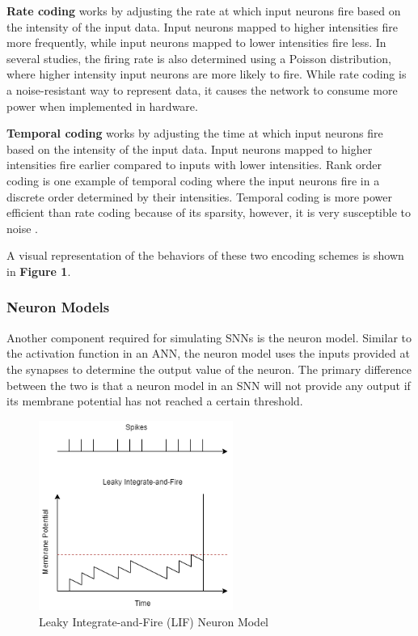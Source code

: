 \documentclass[journal]{IEEEtran}
\begin{document}
\textbf{Rate coding} works by adjusting the rate at which input neurons fire based on the intensity of the input data. Input neurons mapped to higher intensities fire more frequently, while input neurons mapped to lower intensities fire less. In several studies, the firing rate is also determined using a Poisson distribution, where higher intensity input neurons are more likely to fire. While rate coding is a noise-resistant way to represent data, it causes the network to consume more power when implemented in hardware.

\textbf{Temporal coding} works by adjusting the time at which input neurons fire based on the intensity of the input data. Input neurons mapped to higher intensities fire earlier compared to inputs with lower intensities. Rank order coding is one example of temporal coding where the input neurons fire in a discrete order determined by their intensities. Temporal coding is more power efficient than rate coding because of its sparsity, however, it is very susceptible to noise \cite{thorpe1998rank}.

A visual representation of the behaviors of these two encoding schemes is shown in \textbf{Figure 1}.


\subsubsection{Neuron Models}

Another component required for simulating SNNs is the neuron model. Similar to the activation function in an ANN, the neuron model uses the inputs provided at the synapses to determine the output value of the neuron. The primary difference between the two is that a neuron model in an SNN will not provide any output if its membrane potential has not reached a certain threshold.

\begin{figure}[!t]
\centering
\includegraphics[width=2.5in]{lif_model.png}
\caption{Leaky Integrate-and-Fire (LIF) Neuron Model}
\label{fig_sim}
\end{figure}
\end{document}
